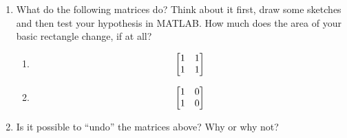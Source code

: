  \begin{prob}\label{ex:singular}
 \begin{enumerate}
     \item 
What do the following matrices do? Think about it first, draw some sketches and then test your hypothesis in MATLAB. How much does the area of your basic rectangle change, if at all?
 \begin{enumerate}
 \item \[ \begin{bmatrix} 1 & 1 \\ 1 & 1\end{bmatrix} \]
 \item \[ \begin{bmatrix} 1 & 0 \\ 1 & 0\end{bmatrix} \]
 \end{enumerate}
 \item Is it possible to ``undo'' the matrices above? Why or why not?
 \end{enumerate}
 \end{prob}
